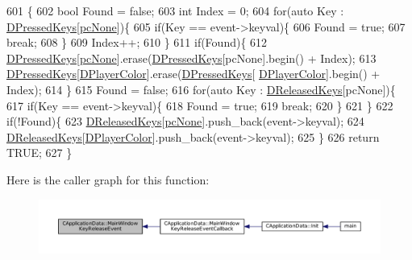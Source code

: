 \begin{DoxyCode}
601                                                                                          \{
602     \textcolor{keywordtype}{bool} Found = \textcolor{keyword}{false};
603     \textcolor{keywordtype}{int} Index = 0;
604     \textcolor{keywordflow}{for}(\textcolor{keyword}{auto} Key : \hyperlink{classCApplicationData_ac6f50c764f7561c0bd2a9fbce55b2701}{DPressedKeys}[\hyperlink{GameDataTypes_8h_aafb0ca75933357ff28a6d7efbdd7602fa88767aa8e02c7b3192bbab4127b3d729}{pcNone}])\{
605         \textcolor{keywordflow}{if}(Key == event->keyval)\{
606             Found = \textcolor{keyword}{true};
607             \textcolor{keywordflow}{break};
608         \}
609         Index++;
610     \}
611     \textcolor{keywordflow}{if}(Found)\{
612         \hyperlink{classCApplicationData_ac6f50c764f7561c0bd2a9fbce55b2701}{DPressedKeys}[\hyperlink{GameDataTypes_8h_aafb0ca75933357ff28a6d7efbdd7602fa88767aa8e02c7b3192bbab4127b3d729}{pcNone}].erase(\hyperlink{classCApplicationData_ac6f50c764f7561c0bd2a9fbce55b2701}{DPressedKeys}[pcNone].begin() + Index);
613         \hyperlink{classCApplicationData_ac6f50c764f7561c0bd2a9fbce55b2701}{DPressedKeys}[\hyperlink{classCApplicationData_a53550939b20cba70570f113e4d1c5d02}{DPlayerColor}].erase(\hyperlink{classCApplicationData_ac6f50c764f7561c0bd2a9fbce55b2701}{DPressedKeys}[
      \hyperlink{classCApplicationData_a53550939b20cba70570f113e4d1c5d02}{DPlayerColor}].begin() + Index);
614     \}
615     Found = \textcolor{keyword}{false};
616     \textcolor{keywordflow}{for}(\textcolor{keyword}{auto} Key : \hyperlink{classCApplicationData_adcef59167cadd8ee516884a7c0df08f6}{DReleasedKeys}[pcNone])\{
617         \textcolor{keywordflow}{if}(Key == event->keyval)\{
618             Found = \textcolor{keyword}{true};
619             \textcolor{keywordflow}{break};
620         \}
621     \}
622     \textcolor{keywordflow}{if}(!Found)\{
623         \hyperlink{classCApplicationData_adcef59167cadd8ee516884a7c0df08f6}{DReleasedKeys}[\hyperlink{GameDataTypes_8h_aafb0ca75933357ff28a6d7efbdd7602fa88767aa8e02c7b3192bbab4127b3d729}{pcNone}].push\_back(event->keyval);
624         \hyperlink{classCApplicationData_adcef59167cadd8ee516884a7c0df08f6}{DReleasedKeys}[\hyperlink{classCApplicationData_a53550939b20cba70570f113e4d1c5d02}{DPlayerColor}].push\_back(event->keyval);
625     \}
626     \textcolor{keywordflow}{return} TRUE;
627 \}
\end{DoxyCode}
Here is the caller graph for this function\+:\nopagebreak
\begin{figure}[H]
\begin{center}
\leavevmode
\includegraphics[width=350pt]{classCApplicationData_aff9f46bccd458a0dcca968e4a46c7d9b_icgraph}
\end{center}
\end{figure}
